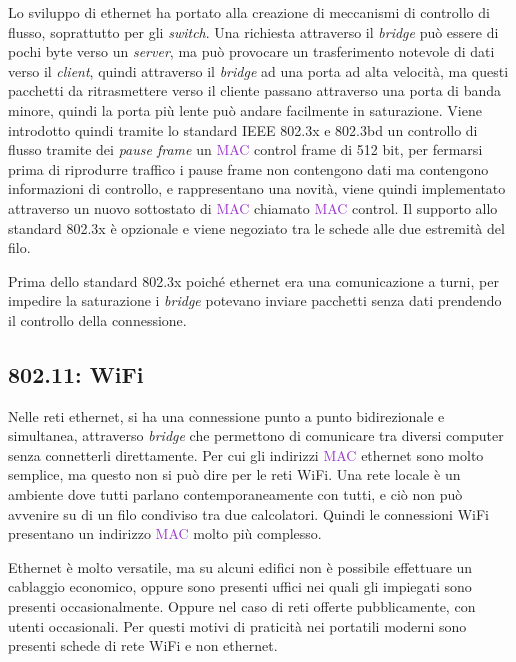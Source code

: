 \documentclass{article}
\numberwithin{equation}{subsection}
\begin{document}
Lo sviluppo di ethernet ha portato alla creazione di meccanismi di controllo di flusso, soprattutto per gli \textit{switch}. Una richiesta attraverso il \textit{bridge} può essere di 
pochi byte verso un \textit{server}, ma può provocare un trasferimento notevole di dati verso il \textit{client}, quindi attraverso il \textit{bridge} ad una porta ad alta velocità, ma questi 
pacchetti da ritrasmettere verso il cliente passano attraverso una porta di banda minore, quindi la porta più lente può andare facilmente in saturazione. 
Viene introdotto quindi tramite lo standard IEEE 802.3x e 802.3bd un controllo di flusso tramite dei \textit{pause frame} un \textcolor{DarkOrchid}{MAC} control frame di 512 bit, per fermarsi 
prima di riprodurre traffico i pause frame non contengono dati ma contengono informazioni di controllo, e rappresentano una novità, viene quindi implementato 
attraverso un nuovo sottostato di \textcolor{DarkOrchid}{MAC} chiamato \textcolor{DarkOrchid}{MAC} control. Il supporto allo standard 802.3x è opzionale e viene negoziato tra le schede alle due estremità del filo. 

Prima dello standard 802.3x poiché ethernet era una comunicazione a turni, per impedire la saturazione i \textit{bridge} potevano inviare pacchetti senza dati prendendo il 
controllo della connessione. 

\subsection{802.11: \textcolor{Sepia}{WiFi}}

Nelle reti ethernet, si ha una connessione punto a punto bidirezionale e simultanea, attraverso \textit{bridge} che permettono di comunicare tra 
diversi computer senza connetterli direttamente. Per cui gli indirizzi \textcolor{DarkOrchid}{MAC} ethernet sono molto semplice, ma questo non si 
può dire per le reti \textcolor{Sepia}{WiFi}. Una rete locale è un ambiente dove tutti parlano contemporaneamente con tutti, e ciò non può avvenire su di un filo condiviso tra due 
calcolatori. Quindi le connessioni \textcolor{Sepia}{WiFi} presentano un indirizzo \textcolor{DarkOrchid}{MAC} molto più complesso. 

Ethernet è molto versatile, ma su alcuni edifici non è possibile effettuare un cablaggio economico, oppure sono presenti uffici nei quali gli impiegati sono 
presenti occasionalmente. Oppure nel caso di reti offerte pubblicamente, con utenti occasionali. 
Per questi motivi di praticità nei portatili moderni sono presenti schede di rete \textcolor{Sepia}{WiFi} e non ethernet. 
\end{document}
